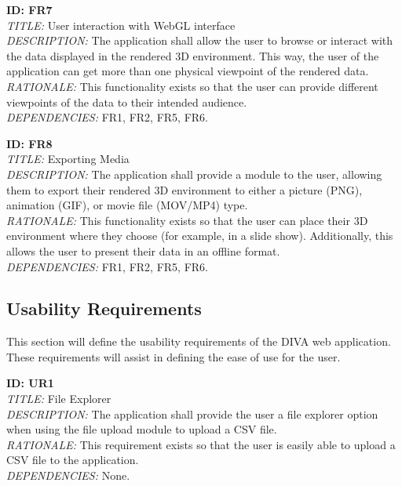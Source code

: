 \documentclass[journal,10pt,onecolumn,compsoc]{IEEEtran} \usepackage[margin=1.0in]{geometry} \usepackage{pdfpages}
\begin{document}
        \noindent \textbf{ID: FR7}\\
        \textit{TITLE:} User interaction with WebGL interface\\
        \textit{DESCRIPTION:} The application shall allow the user to browse or interact with the data displayed in the rendered 3D environment. This way, the user of the application can get more than one physical viewpoint of the rendered data.\\
        \textit{RATIONALE:} This functionality exists so that the user can provide different viewpoints of the data to their intended audience.\\
        \textit{DEPENDENCIES:} FR1, FR2, FR5, FR6. 
        \newline
        
        \noindent \textbf{ID: FR8}\\
        \textit{TITLE:} Exporting Media\\
        \textit{DESCRIPTION:} The application shall provide a module to the user, allowing them to export their rendered 3D environment to either a picture (PNG), animation (GIF), or movie file (MOV/MP4) type.\\
        \textit{RATIONALE:} This functionality exists so that the user can place their 3D environment where they choose (for example, in a slide show). Additionally, this allows the user to present their data in an offline format.\\
        \textit{DEPENDENCIES:} FR1, FR2, FR5, FR6. 

    \subsection{Usability Requirements}
    This section will define the usability requirements of the DIVA web application. These requirements will assist in defining the ease of use for the user. \newline

    \noindent \textbf{ID: UR1}\\
    \textit{TITLE:} File Explorer\\
    \textit{DESCRIPTION:} The application shall provide the user a file explorer option when using the file upload module to upload a CSV file.\\
    \textit{RATIONALE:} This requirement exists so that the user is easily able to upload a CSV file to the application.\\
    \textit{DEPENDENCIES:} None.
    \newline
    
\end{document}
